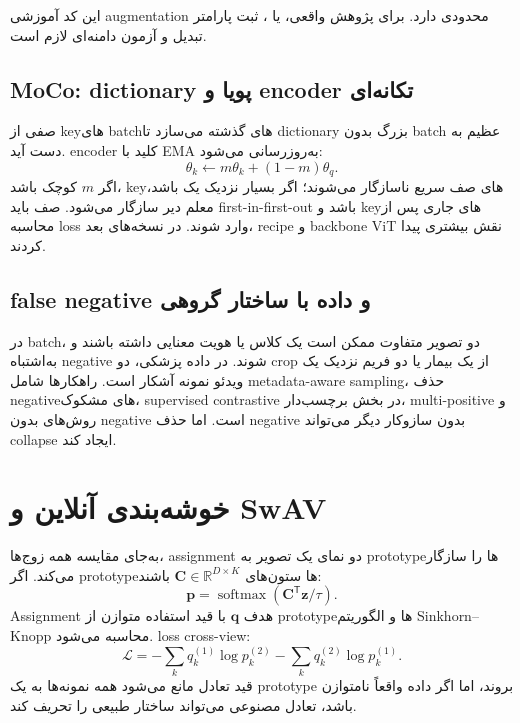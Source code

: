 \documentclass[12pt,openany,oneside]{book}
\newcommand{\R}{\mathbb{R}}
\newcommand{\trans}{^{\mathsf T}}
\newcommand{\vect}[1]{\bm{#1}}
\newcommand{\mat}[1]{\bm{#1}}
\newcommand{\softmax}{\operatorname{softmax}}
\begin{document}
\begin{workshopbox}
\begin{latin}


\end{latin}
این کد آموزشی augmentation محدودی دارد. برای پژوهش واقعی،  یا ، ثبت پارامتر تبدیل و آزمون دامنه‌ای لازم است.
\end{workshopbox}

\subsection{MoCo: dictionary پویا و encoder تکانه‌ای}
 صفی از keyهای batchهای گذشته می‌سازد تا dictionary بزرگ بدون batch عظیم به دست آید. encoder کلید با EMA به‌روزرسانی می‌شود:
\begin{equation}
\theta_k\leftarrow m\theta_k+(1-m)\theta_q.
\label{eq:moco-ema}
\end{equation}
اگر $m$ کوچک باشد، keyهای صف سریع ناسازگار می‌شوند؛ اگر بسیار نزدیک یک باشد، معلم دیر سازگار می‌شود. صف باید first-in-first-out باشد و keyهای جاری پس از محاسبه loss وارد شوند. در نسخه‌های بعد، recipe و backbone ViT نقش بیشتری پیدا کردند.

\subsection{false negative و داده با ساختار گروهی}
در batch، دو تصویر متفاوت ممکن است یک کلاس یا هویت معنایی داشته باشند و به‌اشتباه negative شوند. در داده پزشکی، دو crop از یک بیمار یا دو فریم نزدیک یک ویدئو نمونه آشکار است. راهکارها شامل metadata-aware sampling، حذف negativeهای مشکوک، supervised contrastive در بخش برچسب‌دار، multi-positive و روش‌های بدون negative است. اما حذف negative بدون سازوکار دیگر می‌تواند collapse ایجاد کند.

\section{خوشه‌بندی آنلاین و SwAV}
 به‌جای مقایسه همه زوج‌ها، assignment دو نمای یک تصویر به prototypeها را سازگار می‌کند. اگر prototypeها ستون‌های $\mat C\in\R^{D\times K}$ باشند:
\begin{equation}
\vect p=\softmax(\mat C\trans\vect z/\tau).
\end{equation}
Assignment هدف $\vect q$ با قید استفاده متوازن از prototypeها و الگوریتم Sinkhorn--Knopp محاسبه می‌شود. loss cross-view:
\begin{equation}
\mathcal L=-\sum_k q_k^{(1)}\log p_k^{(2)}-
\sum_k q_k^{(2)}\log p_k^{(1)}.
\end{equation}
قید تعادل مانع می‌شود همه نمونه‌ها به یک prototype بروند، اما اگر داده واقعاً نامتوازن باشد، تعادل مصنوعی می‌تواند ساختار طبیعی را تحریف کند.
\end{document}
